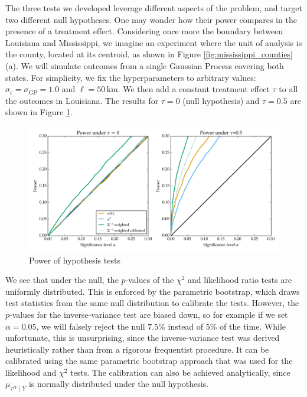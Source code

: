 \documentclass[letter]{article}
\makeatletter
\def\maxwidth{\ifdim\Gin@nat@width>\linewidth\linewidth
\else\Gin@nat@width\fi}
\let\Oldincludegraphics\includegraphics
\renewcommand{\includegraphics}[1]{\Oldincludegraphics[width=.8\maxwidth]{#1}}
\newcommand{\sigmaf}{\sigma_{\mathrm{GP}}}
\newcommand{\sigman}{\sigma_{\epsilon}}
\newcommand{\invvar}{\tau^{IV}}
\makeatother
\begin{document}
The three tests we developed leverage different aspects of the problem,
and target two different null hypotheses. One may wonder how their power
compares in the presence of a treatment effect. Considering once more
the boundary between Louisiana and Mississippi, we imagine an experiment
where the unit of analysis is the county, located at its centroid, as
shown in Figure \ref{fig:mississippi_counties}(a). We will simulate
outcomes from a single Gaussian Process covering both states. For
simplicity, we fix the hyperparameters to arbitrary values:
\(\sigman=\sigmaf=1.0\) and \(\ell=50\,\mathrm{km}\). We then add a
constant treatment effect \(\tau\) to all the outcomes in Louisiana. The
results for \(\tau=0\) (null hypothesis) and \(\tau=0.5\) are shown in
Figure \ref{fig:power}.

\begin{figure}
\centering
\includegraphics{figures/power_HT.png}
\caption{\label{fig:power} Power of hypothesis tests}
\end{figure}

We see that under the null, the \(p\)-values of the \(\chi^2\) and
likelihood ratio tests are uniformly distributed. This is enforced by
the parametric bootstrap, which draws test statistics from the same null
distribution to calibrate the tests. However, the \(p\)-values for the
inverse-variance test are biased down, so for example if we set
\(\alpha=0.05\), we will falsely reject the null \(7.5\%\) instead of
\(5\%\) of the time. While unfortunate, this is unsurprising, since the
inverse-variance test was derived heuristically rather than from a
rigorous frequentist procedure. It can be calibrated using the same
parametric bootstrap approach that was used for the likelihood and
\(\chi^2\) tests. The calibration can also be achieved analytically,
since \(\mu_{\invvar \mid Y}\) is normally distributed under the null
hypothesis.
\end{document}
